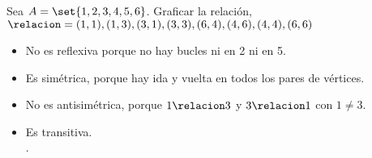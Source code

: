 \ejercicio Sea $A = \set{1, 2, 3, 4, 5, 6}$. Graficar la relación, $\relacion= {(1,1), (1,3), (3,1), (3,3), (6,4), (4,6), (4,4), (6,6)}$
\begin{minipage}{0.25\textwidth}
	\veinte
\end{minipage}
\begin{minipage}{0.7\textwidth}
	\begin{itemize}
		\item No es reflexiva porque no hay bucles ni en 2 ni en 5.
		\item Es simétrica, porque hay ida y vuelta en todos los pares de vértices.
		\item No es antisimétrica, porque $1 \relacion 3$ y $3 \relacion 1$ con $1 \neq 3$.
		\item Es transitiva. \\
		      .
	\end{itemize}
\end{minipage}
